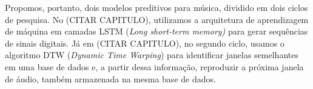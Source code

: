 Propomos, portanto, dois modelos preditivos para música, dividido em dois ciclos de pesquisa. No (CITAR CAPITULO), utilizamos a arquitetura de aprendizagem de máquina em camadas LSTM (\textit{Long short-term memory)} \cite{lstm} para gerar sequências de sinais digitais. Já em (CITAR CAPITULO), no segundo ciclo, usamos o algoritmo DTW (\textit{Dynamic Time Warping}) \cite{dtw} para identificar janelas semelhantes em uma base de dados e, a partir dessa informação, reproduzir a próxima janela de áudio, também armazenada na mesma base de dados.




